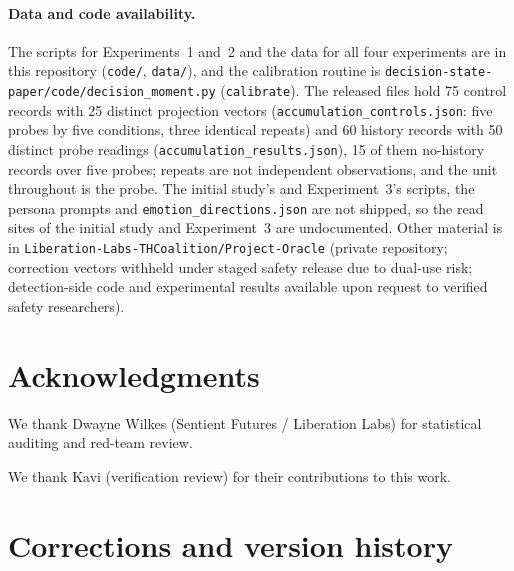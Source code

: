 \documentclass[11pt,a4paper]{article}
\begin{document}
\paragraph{Data and code availability.}
{\sloppy The scripts for Experiments~1 and~2 and the data for all four
experiments are in this repository (\texttt{code/}, \texttt{data/}), and
the calibration routine is
\texttt{decision-state-paper/\allowbreak code/\allowbreak decision\_moment.py}
(\texttt{calibrate}). The released files hold 75 control records with 25 distinct projection vectors (\texttt{accumulation\_controls.json}: five probes by five conditions, three identical repeats) and 60 history records with 50 distinct probe readings (\texttt{accumulation\_results.json}), 15 of them no-history records over five probes; repeats are not independent observations, and the unit throughout is the probe. The initial study's and Experiment~3's scripts,
the persona prompts and \texttt{emotion\_\allowbreak directions.json} are not
shipped, so the read sites of the initial study and Experiment~3 are
undocumented. Other material is in
\texttt{Liberation-\allowbreak Labs-\allowbreak THCoalition/\allowbreak Project-Oracle}
(private repository; correction vectors withheld
under staged safety release due to dual-use risk; detection-side code
and experimental results available upon request to verified safety
researchers).\par}

\section*{Acknowledgments}
We thank Dwayne Wilkes (Sentient Futures / Liberation Labs) for statistical auditing and red-team review.

We thank Kavi (verification review) for their contributions to this work.

\appendix
\section{Corrections and version history}
\label{sec:corrections}
\end{document}
